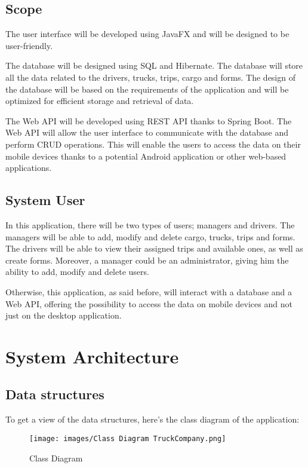 \documentclass{article}
\begin{document}
\subsection{Scope}

The user interface will be developed using JavaFX and will be designed to be user-friendly.

The database will be designed using SQL and Hibernate. The database will store all the data
related to the drivers, trucks, trips, cargo and forms. The design of the database will be based on
the requirements of the application and will be optimized for efficient storage and retrieval
of data.

The Web API will be developed using REST API thanks to Spring Boot. The Web API will allow
the user interface to communicate with the database and perform CRUD operations. This will
enable the users to access the data on their mobile devices thanks to a potential Android 
application or other web-based applications.

\subsection{System User}
In this application, there will be two types of users; managers and drivers. The managers will
be able to add, modify and delete cargo, trucks, trips and forms. The drivers will be able 
to view their assigned trips and available ones, as well as create forms. Moreover, a
manager could be an administrator, giving him the ability to add, modify and delete users.

Otherwise, this application, as said before, will interact with a database and a Web API, 
offering the possibility to access the data on mobile devices and not just on the desktop
application.

\newpage

\section{System Architecture}
\subsection{Data structures}
To get a view of the data structures, here's the class diagram of the application:

\begin{figure}[h]
    \centering
    \texttt{[image: images/Class Diagram TruckCompany.png]}
    \caption{Class Diagram}
\end{figure}
\end{document}
